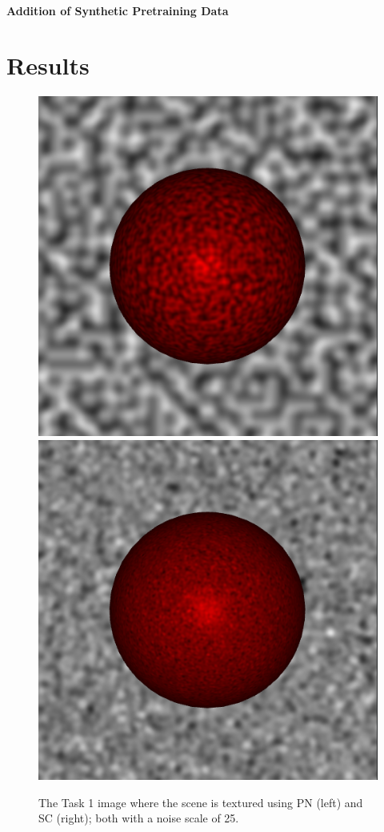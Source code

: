 \documentclass[12pt,fleqn]{article}
\begin{document}
\paragraph{Addition of Synthetic Pretraining Data}

\section{Results}%
\label{sec:results}
\begin{figure}[H]
    \centering
        \includegraphics[width=.48\linewidth]{t1-perlin}
        \includegraphics[width=.48\linewidth]{t1-sc}
    \caption{
        The Task 1 image where the scene is textured using PN (left) and SC (right); both with a noise scale of 25.
    }
    \label{fig:t1}
\end{figure}\noindent
\end{document}

